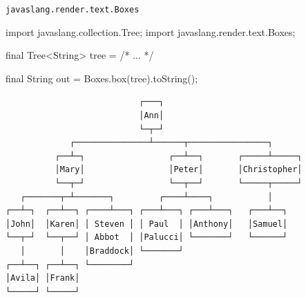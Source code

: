 \documentclass[smaller]{beamer}
\begin{document}
\begin{frame}{\texttt{javaslang.render.text.Boxes}}
  \footnotesize
\begin{pygmented}[]
import javaslang.collection.Tree;
import javaslang.render.text.Boxes;

final Tree<String> tree = /* ... */

final String out = Boxes.box(tree).toString();
\end{pygmented}

\begin{verbatim}
                           ┌───┐                            
                           │Ann│                            
                           └─┬─┘                            
             ┌───────────────┴──────┬────────────────┐      
          ┌──┴─┐                 ┌──┴──┐       ┌─────┴─────┐
          │Mary│                 │Peter│       │Christopher│
          └──┬─┘                 └──┬──┘       └─────┬─────┘
   ┌───────┬─┴───────┐         ┌────┴────┐           │      
┌──┴─┐  ┌──┴──┐ ┌────┴───┐ ┌───┴───┐ ┌───┴───┐   ┌───┴──┐   
│John│  │Karen│ │ Steven │ │ Paul  │ │Anthony│   │Samuel│   
└──┬─┘  └──┬──┘ │ Abbot  │ │Palucci│ └───────┘   └──────┘   
   │       │    │Braddock│ └───────┘                        
┌──┴──┐ ┌──┴──┐ └────────┘                                  
│Avila│ │Frank│                                             
└─────┘ └─────┘                                             
\end{verbatim}
\end{frame}
\end{document}

